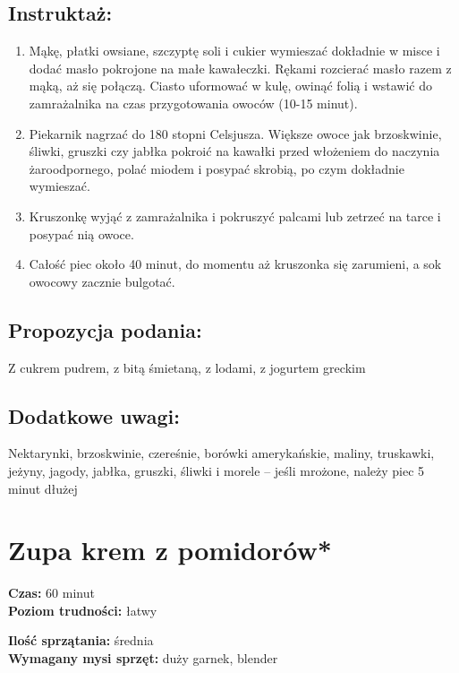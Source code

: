 \documentclass[a4paper,10pt]{book}
\begin{document}
\section*{Instruktaż:}
\begin{enumerate}
    \item Mąkę, płatki owsiane, szczyptę soli i cukier wymieszać dokładnie w misce i dodać masło pokrojone na małe kawałeczki. Rękami rozcierać masło razem z mąką, aż się połączą. Ciasto uformować w kulę, owinąć folią i wstawić do zamrażalnika na czas przygotowania owoców (10-15 minut).
    \item Piekarnik nagrzać do 180 stopni Celsjusza. Większe owoce jak brzoskwinie, śliwki, gruszki czy jabłka pokroić na kawałki przed włożeniem do naczynia żaroodpornego, polać miodem i posypać skrobią, po czym dokładnie wymieszać. 
    \item Kruszonkę wyjąć z zamrażalnika i pokruszyć palcami lub zetrzeć na tarce i posypać nią owoce.
    \item Całość piec około 40 minut, do momentu aż kruszonka się zarumieni, a sok owocowy zacznie bulgotać. 
\end{enumerate}

\vspace{0.5cm} 

\small
\section*{Propozycja podania:}
Z cukrem pudrem, z bitą śmietaną, z lodami, z jogurtem greckim

\vspace{0.3cm}

\section*{Dodatkowe uwagi:}
Nektarynki, brzoskwinie, czereśnie, borówki amerykańskie, maliny, truskawki, jeżyny, jagody, jabłka, gruszki, śliwki i morele – jeśli mrożone, należy piec 5 minut dłużej

\chapter{Zupa krem z pomidorów*}

\vspace{0.1cm}
\small
\begin{minipage}{0.45\textwidth}
    \noindent \textbf{Czas:} 60 minut \\
    \textbf{Poziom trudności:} łatwy
\end{minipage}
\begin{minipage}{0.45\textwidth}
    \noindent \textbf{Ilość sprzątania:} średnia\\
    \textbf{Wymagany mysi sprzęt:} duży garnek, blender
\end{minipage}
\normalsize
\vspace{0.5cm}
\end{document}
